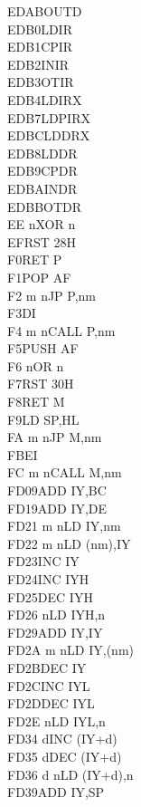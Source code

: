 \begin{multicols}{3}
{\begin{tabbing}
	EDAB\>OUTD\\
	EDB0\>LDIR\\
	EDB1\>CPIR\\
	EDB2\>INIR\\
	EDB3\>OTIR\\
	EDB4\>LDIRX\ZXN\\
	EDB7\>LDPIRX\ZXN\\
	EDBC\>LDDRX\ZXN\\
	EDB8\>LDDR\\
	EDB9\>CPDR\\
	EDBA\>INDR\\
	EDBB\>OTDR\\
	EE n\>XOR n\\
	EF\>RST 28H\\
	F0\>RET P\\
	F1\>POP AF\\
	F2 m n\>JP P,nm\\
	F3\>DI\\
	F4 m n\>CALL P,nm\\
	F5\>PUSH AF\\
	F6 n\>OR n\\
	F7\>RST 30H\\
	F8\>RET M\\
	F9\>LD SP,HL\\
	FA m n\>JP M,nm\\
	FB\>EI\\
	FC m n\>CALL M,nm\\
	FD09\>ADD IY,BC\\
	FD19\>ADD IY,DE\\
	FD21 m n\>LD IY,nm\\
	FD22 m n\>LD (nm),IY\\
	FD23\>INC IY\\
	FD24\>INC IYH\UNDOC\\
	FD25\>DEC IYH\UNDOC\\
	FD26 n\>LD IYH,n\UNDOC\\
	FD29\>ADD IY,IY\\
	FD2A m n\>LD IY,(nm)\\
	FD2B\>DEC IY\\
	FD2C\>INC IYL\UNDOC\\
	FD2D\>DEC IYL\UNDOC\\
	FD2E n\>LD IYL,n\UNDOC\\
	FD34 d\>INC (IY+d)\\
	FD35 d\>DEC (IY+d)\\
	FD36 d n\>LD (IY+d),n\\
	FD39\>ADD IY,SP\\

\end{tabbing}}
\end{multicols}
